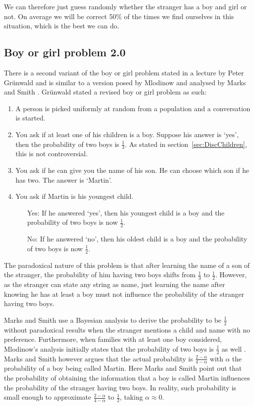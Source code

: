 \documentclass[a4paper]{report}
\theoremstyle{plain}
\theoremstyle{definition}
\theoremstyle{remark}
\numberwithin{equation}{chapter}
\DeclareMathOperator{\1}{\mathbbm{1}}
\begin{document}
We can therefore just guess randomly whether the stranger has a boy and girl or not. On average we will be correct 50\% of the times we find ourselves in this situation, which is the best we can do.

\subsection{Boy or girl problem 2.0}\label{sec:DiscChild2}
There is a second variant of the boy or girl problem stated in a lecture by Peter Grünwald \cite{Grunwald19} and is similar to a version posed by Mlodinow \cite{Mlodinow09} and analysed by Marks and Smith \cite{Marks11}. Grünwald stated a revised boy or girl problem as such:
\begin{enumerate}
    \item A person is picked uniformly at random from a population and a conversation is started.
    \item You ask if at least one of his children is a boy. Suppose his answer is `yes', then the probability of two boys is $\frac{1}{3}$. As stated in section~\ref{sec:DiscChildren}, this is not controversial.
    \item You ask if he can give you the name of his son. He can choose which son if he has two. The answer is `Martin'.
    \item You ask if Martin is his youngest child.
    \begin{itemize}
        \item[Yes:] If he answered `yes', then his youngest child is a boy and the probability of two boys is now $\frac{1}{2}$.
        \item[No:] If he answered `no', then his oldest child is a boy and the probability of two boys is now $\frac{1}{2}$.
    \end{itemize}
\end{enumerate}

The paradoxical nature of this problem is that after learning the name of a son of the stranger, the probability of him having two boys shifts from $\frac{1}{3}$ to $\frac{1}{2}$. However, as the stranger can state any string as name, just learning the name after knowing he has at least a boy must not influence the probability of the stranger having two boys.

Marks and Smith \cite{Marks11} use a Bayesian analysis to derive the probability to be $\frac{1}{2}$ without paradoxical results when the stranger mentions a child and name with no preference. Furthermore, when families with at least one boy considered, Mlodinow's analysis initially states that the probability of two boys is $\frac{1}{2}$ as well \cite{Marks11}. Marks and Smith however argues that the actual probability is $\frac{2-\alpha}{4-\alpha}$ with $\alpha$ the probability of a boy being called Martin. Here Marks and Smith point out that the probability of obtaining the information that a boy is called Martin influences the probability of the stranger having two boys. In reality, such probability is small enough to approximate $\frac{2-\alpha}{4-\alpha}$ to $\frac{1}{2}$, taking $\alpha\approx0$.
\end{document}
